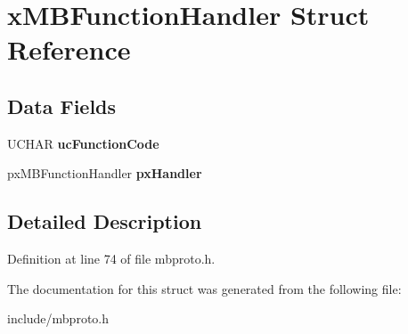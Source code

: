 \hypertarget{structx_m_b_function_handler}{}\section{x\+M\+B\+Function\+Handler Struct Reference}
\label{structx_m_b_function_handler}
\subsection*{Data Fields}
\begin{DoxyCompactItemize}
\item 
U\+C\+H\+AR {\bfseries uc\+Function\+Code}\hypertarget{structx_m_b_function_handler_acf0798484cf2b6b1ec21389d3f2a997c}{}\label{structx_m_b_function_handler_acf0798484cf2b6b1ec21389d3f2a997c}

\item 
px\+M\+B\+Function\+Handler {\bfseries px\+Handler}\hypertarget{structx_m_b_function_handler_ab2ea74b69155c337ec9c0d2e229160ce}{}\label{structx_m_b_function_handler_ab2ea74b69155c337ec9c0d2e229160ce}

\end{DoxyCompactItemize}


\subsection{Detailed Description}


Definition at line 74 of file mbproto.\+h.



The documentation for this struct was generated from the following file\+:\begin{DoxyCompactItemize}
\item 
include/mbproto.\+h\end{DoxyCompactItemize}

